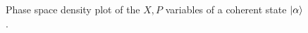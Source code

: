 
\begin{figure}[htb]
	\centering
	
	\caption{Phase space density plot of the $X,P$ variables of a coherent state $\ket{\alpha}$.}
\end{figure}